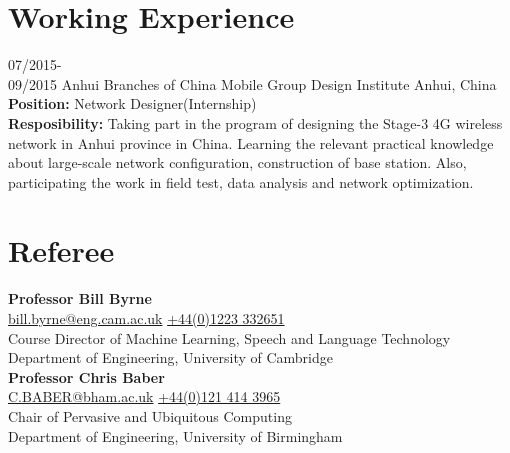 \documentclass[]{friggeri-cv}
\begin{document}
\section{Working Experience}

\begin{entrylist}
  \entry
    {07/2015-\\09/2015}
    {Anhui Branches of China Mobile Group Design Institute}
    {Anhui, China}
    {\textbf{Position:} Network Designer(Internship)\\
    \textbf{Resposibility:} Taking part in the program of designing the Stage-3 4G wireless network in Anhui province in China. Learning the relevant practical knowledge about large-scale network configuration, construction of base station. Also, participating the work in field test, data analysis and network optimization.}
    
\end{entrylist}

\section{Referee}
    \textbf{Professor Bill Byrne}
    \\\href{mailto:bill.byrne@eng.cam.ac.uk}	      {bill.byrne@eng.cam.ac.uk}  \href{}{+44(0)1223 332651}
    \\Course Director of Machine Learning, Speech and Language Technology
    \\Department of Engineering, University of Cambridge\\
    
    \textbf{Professor Chris Baber}\\ 
    \href{mailto:C.BABER@bham.ac.uk}{C.BABER@bham.ac.uk}  \href{}{+44(0)121 414 3965}
    \\Chair of Pervasive and Ubiquitous Computing\\Department of Engineering, University of Birmingham

% 
\end{document}
